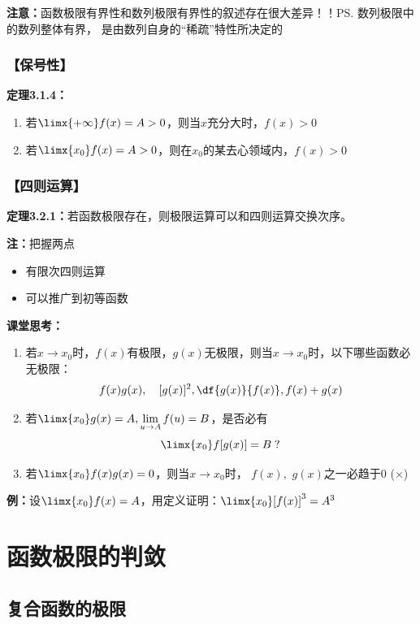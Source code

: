 {\bf 注意：}函数极限有界性和数列极限有界性的叙述存在很大差异！！\ps{数列极限中的数列整体有界，
是由数列自身的“稀疏”特性所决定的}

\subsubsection{【保号性】}

{\bf 定理3.1.4：}
\begin{enumerate}[(1)]
  \setlength{\itemindent}{1cm}
  \item 若$\limx{+\infty}f(x)=A>0$，则当$x$充分大时，$f(x)>0$
  \item 若$\limx{x_0}f(x)=A>0$，则在$x_0$的某去心领域内，$f(x)>0$
\end{enumerate}

\subsubsection{【四则运算】}

{\bf 定理3.2.1：}若函数极限存在，则极限运算可以和四则运算交换次序。

{\bf 注：}把握两点
\begin{itemize}
  \setlength{\itemindent}{1cm}
  \item 有限次四则运算
  \item 可以推广到初等函数
\end{itemize}

{\bf 课堂思考：}
\begin{enumerate}[(1)]
  \setlength{\itemindent}{1cm}
  \item 若$x\to x_0$时，$f(x)$有极限，$g(x)$无极限，则当$x\to x_0$时，以下哪些函数必无极限：
  $$f(x)g(x),\quad [g(x)]^2,\df{g(x)}{f(x)}, f(x)+g(x)$$ 
  \item 若$\limx{x_0}g(x)=A,\lim\limits_{u\to A}f(u)=B$，是否必有
  $$\limx{x_0}f[g(x)]=B\;?$$
  \item 若$\limx{x_0}f(x)g(x)=0$，则当$x\to
  x_0$时， $f(x),$ $g(x)$之一必趋于$0$ ({$\times$})
\end{enumerate}

{\bf 例：}设$\limx{x_0}f(x)=A$，用定义证明：$\limx{x_0}[f(x)]^3=A^3$

\section{函数极限的判敛}

\subsection{复合函数的极限}

